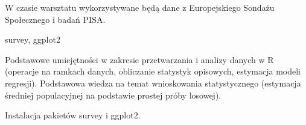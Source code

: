 \documentclass[\main/boa.tex]{subfiles}
\begin{document}
W czasie warsztatu wykorzystywane będą dane z Europejskiego Sondażu Społecznego i badań PISA.

\pakiety survey, ggplot2

\umiejetnosci Podstawowe umiejętności w zakresie przetwarzania i analizy danych w R (operacje na ramkach danych, obliczanie statystyk opisowych, estymacja modeli regresji). Podstawowa wiedza na temat wnioskowania statystycznego (estymacja średniej populacyjnej na podstawie prostej próby losowej).

\wymagania Instalacja pakietów survey i ggplot2.
\end{document}
